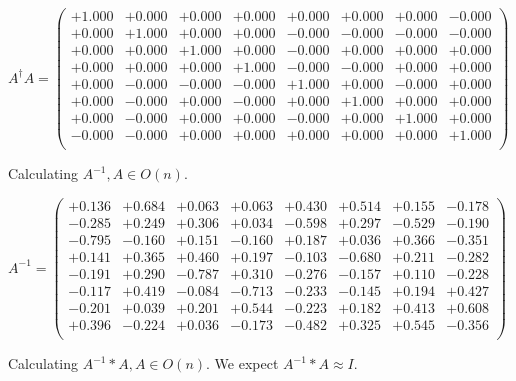 \documentclass[9pt]{article}
\theoremstyle{plain}
\theoremstyle{definition}
\theoremstyle{remark}
\numberwithin{equation}{section}
\begin{document}
$A^{\dag} A = \left(
\begin{array}{
cccccccc}
+1.000 & +0.000 & +0.000 & +0.000 & +0.000 & +0.000 & +0.000 & -0.000 \\
+0.000 & +1.000 & +0.000 & +0.000 & -0.000 & -0.000 & -0.000 & -0.000 \\
+0.000 & +0.000 & +1.000 & +0.000 & -0.000 & +0.000 & +0.000 & +0.000 \\
+0.000 & +0.000 & +0.000 & +1.000 & -0.000 & -0.000 & +0.000 & +0.000 \\
+0.000 & -0.000 & -0.000 & -0.000 & +1.000 & +0.000 & -0.000 & +0.000 \\
+0.000 & -0.000 & +0.000 & -0.000 & +0.000 & +1.000 & +0.000 & +0.000 \\
+0.000 & -0.000 & +0.000 & +0.000 & -0.000 & +0.000 & +1.000 & +0.000 \\
-0.000 & -0.000 & +0.000 & +0.000 & +0.000 & +0.000 & +0.000 & +1.000 \\
\end{array}
\right)$ \newline 

Calculating $A^{-1} ,  A \in O(n)$.

$A^{-1} = \left(
\begin{array}{
cccccccc}
+0.136 & +0.684 & +0.063 & +0.063 & +0.430 & +0.514 & +0.155 & -0.178 \\
-0.285 & +0.249 & +0.306 & +0.034 & -0.598 & +0.297 & -0.529 & -0.190 \\
-0.795 & -0.160 & +0.151 & -0.160 & +0.187 & +0.036 & +0.366 & -0.351 \\
+0.141 & +0.365 & +0.460 & +0.197 & -0.103 & -0.680 & +0.211 & -0.282 \\
-0.191 & +0.290 & -0.787 & +0.310 & -0.276 & -0.157 & +0.110 & -0.228 \\
-0.117 & +0.419 & -0.084 & -0.713 & -0.233 & -0.145 & +0.194 & +0.427 \\
-0.201 & +0.039 & +0.201 & +0.544 & -0.223 & +0.182 & +0.413 & +0.608 \\
+0.396 & -0.224 & +0.036 & -0.173 & -0.482 & +0.325 & +0.545 & -0.356 \\
\end{array}
\right)$ \newline 

Calculating $A^{-1} *A  ,  A \in O(n)$.   We expect $A^{-1} *A  \approx I$. 
\end{document}
